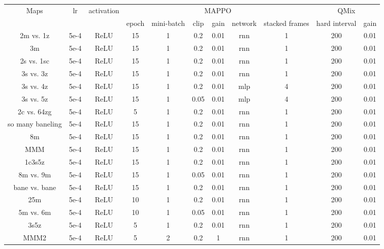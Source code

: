 \begin{table}[]
\centering
\begin{adjustwidth}{-.2in}{-.5in}
\begin{tabular}{ccccccccc|cc}
\toprule
\multirow{2}{*}{Maps} & \multirow{2}{*}{lr} & \multirow{2}{*}{activation} & \multicolumn{6}{c}{MAPPO}                                         & \multicolumn{2}{c}{QMix} \\ \cmidrule{4-11} 
                      &                     &                             & epoch & mini-batch & clip & gain & network & stacked frames & hard interval    & gain   \\ \midrule
2m vs. 1z        & 5e-4 & ReLU & 15 & 1 & 0.2  & 0.01 & rnn & 1 & 200 & 0.01 \\
3m               & 5e-4 & ReLU & 15 & 1 & 0.2  & 0.01 & rnn & 1 & 200 & 0.01 \\
2s vs. 1sc       & 5e-4 & ReLU & 15 & 1 & 0.2  & 0.01 & rnn & 1 & 200 & 0.01 \\
3s vs. 3z        & 5e-4 & ReLU & 15 & 1 & 0.2  & 0.01 & rnn & 1 & 200 & 0.01 \\
3s vs. 4z        & 5e-4 & ReLU & 15 & 1 & 0.2  & 0.01 & mlp & 4 & 200 & 0.01 \\
3s vs. 5z        & 5e-4 & ReLU & 15 & 1 & 0.05  & 0.01 & mlp & 4 & 200 & 0.01 \\
2c vs. 64zg      & 5e-4 & ReLU & 5  & 1 & 0.2  & 0.01 & rnn & 1 & 200 & 0.01 \\
so many baneling & 5e-4 & ReLU & 15 & 1 & 0.2  & 0.01 & rnn & 1 & 200 & 0.01 \\
8m               & 5e-4 & ReLU & 15 & 1 & 0.2  & 0.01 & rnn & 1 & 200 & 0.01 \\
MMM              & 5e-4 & ReLU & 15 & 1 & 0.2  & 0.01 & rnn & 1 & 200 & 0.01 \\
1c3s5z           & 5e-4 & ReLU & 15 & 1 & 0.2  & 0.01 & rnn & 1 & 200 & 0.01 \\
8m vs. 9m        & 5e-4 & ReLU & 15 & 1 & 0.05  & 0.01 & rnn & 1 & 200 & 0.01 \\
bane vs. bane    & 5e-4 & ReLU & 15 & 1 & 0.2  & 0.01 & rnn & 1 & 200 & 0.01 \\
25m              & 5e-4 & ReLU & 10 & 1 & 0.2  & 0.01 & rnn & 1 & 200 & 0.01 \\
5m vs. 6m        & 5e-4 & ReLU & 10 & 1 & 0.05 & 0.01 & rnn & 1 & 200 & 0.01 \\
3s5z             & 5e-4 & ReLU & 5  & 1 & 0.2  & 0.01 & rnn & 1 & 200 & 0.01 \\
MMM2             & 5e-4 & ReLU & 5  & 2 & 0.2  & 1    & rnn & 1 & 200 & 0.01 \\

\end{tabular}
\end{adjustwidth}
\end{table}

